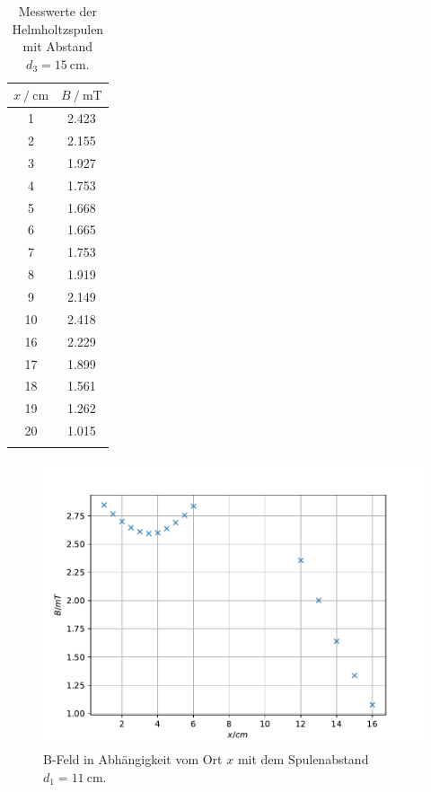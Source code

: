 \begin{table}
\centering
\caption{Messwerte der Helmholtzspulen mit Abstand $d_3=\SI{15}{\centi\metre}$.}
\begin{tabular}{cc}
\toprule
$x \:/\: \si{\centi\metre}$ & $B \:/\: \si{\milli\tesla}$ \\
\midrule
1& 2.423  \\
2& 2.155\\
3& 1.927\\
4& 1.753\\
5& 1.668\\
6& 1.665\\
7& 1.753\\
8& 1.919\\
9& 2.149\\
10& 2.418\\
16& 2.229\\
17& 1.899\\
18& 1.561\\
19& 1.262\\
20& 1.015\\
\bottomrule
\label{tab:helm3}
\end{tabular}
\end{table}

\begin{figure}
\centering
\includegraphics{content/data/plot_helmholtz1.pdf}
\caption{B-Feld in Abhängigkeit vom Ort $x$ mit dem Spulenabstand $d_1=\SI{11}{\centi\metre}$. }
\label{fig:helm1}
\end{figure}

